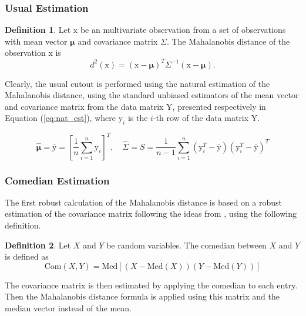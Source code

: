 \documentclass[11pt]{article}
\theoremstyle{definition}
\newtheorem{definition}{Definition}[section]
\theoremstyle{remark}
\theoremstyle{remark}
\begin{document}
\subsubsection*{Usual Estimation}
\begin{definition}
  Let $\boldsymbol{\mathrm{x}}$ be an multivariate observation from a
  set of observations with mean vector $\boldsymbol{\mu}$ and
  covariance matrix $\Sigma$. The Mahalanobis distance of the
  observation $\boldsymbol{\mathrm{x}}$ is
\begin{equation}\label{eq:mahal}
  d^2(\boldsymbol{\mathrm{x}}) = (\boldsymbol{\mathrm{x}} - \boldsymbol{\mu})^T\Sigma^{-1}(\boldsymbol{\mathrm{x}} - \boldsymbol{\mu}).
\end{equation}

\end{definition}

Clearly, the usual cutout is performed using the natural estimation of
the Mahalanobis distance, using the standard unbiased estimators of
the mean vector and covariance matrix from the data matrix
$\boldsymbol{\mathrm{Y}}$, presented respectively in Equation
(\ref{eq:nat_est}), where $\boldsymbol{\mathrm{y}}_i$ is the $i$-th
row of the data matrix $\boldsymbol{\mathrm{Y}}$.

\begin{equation}\label{eq:nat_est}
  \hat{\boldsymbol\mu}=\bar{\boldsymbol{\mathrm{y}}}=\left[\dfrac{1}{n}\sum_{i=1}^{n}\boldsymbol{\mathrm{y}}_i\right]^T,\quad \hat{\Sigma}=S=\dfrac{1}{n-1}\sum_{i=1}^{n} (\boldsymbol{\mathrm{y}}_i^T-\bar{\boldsymbol{\mathrm{y}}})(\boldsymbol{\mathrm{y}}_i^T-\bar{\boldsymbol{\mathrm{y}}})^T
\end{equation}

\subsubsection*{Comedian Estimation}

The first robust calculation of the Mahalanobis distance is based on a
robust estimation of the covariance matrix following the ideas from
\cite{falk1997mad}, using the following definition.
\begin{definition}
  Let $X$ and $Y$ be random variables. The comedian between $X$ and
  $Y$ is defined as
\[
  \mathrm{Com}(X,Y)=\mathrm{Med}\left[(X-\mathrm{Med}(X))(Y-\mathrm{Med}(Y))\right]
\]
\end{definition}
The covariance matrix is then estimated by applying the comedian to
each entry. Then the Mahalanobis distance formula is applied using
this matrix and the median vector instead of the mean.
\end{document}
